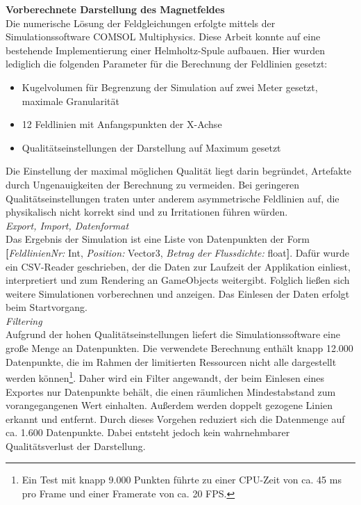 \textbf{Vorberechnete Darstellung des Magnetfeldes}\\
Die numerische Lösung der Feldgleichungen erfolgte mittels der Simulationssoftware COMSOL Multiphysics. Diese Arbeit konnte auf eine bestehende Implementierung einer Helmholtz-Spule aufbauen. Hier wurden lediglich die folgenden Parameter für die Berechnung der Feldlinien gesetzt:
\begin{itemize}
	\setlength{\itemsep}{-1pt}
	\singlespacing
	\item Kugelvolumen für Begrenzung der Simulation auf zwei Meter gesetzt, maximale Granularität
	\item 12 Feldlinien mit Anfangspunkten der X-Achse
	\item Qualitätseinstellungen der Darstellung auf Maximum gesetzt
\end{itemize}

Die Einstellung der maximal möglichen Qualität liegt darin begründet, Artefakte durch Ungenauigkeiten der Berechnung zu vermeiden. Bei geringeren Qualitätseinstellungen traten unter anderem asymmetrische Feldlinien auf, die physikalisch nicht korrekt sind und zu Irritationen führen würden.\\

\textit{Export, Import, Datenformat}\\
Das Ergebnis der Simulation ist eine Liste von Datenpunkten der Form \textbf{[}\textit{FeldlinienNr:} Int, \textit{Position:} Vector3, \textit{Betrag der Flussdichte:} float\textbf{]}. Dafür wurde ein CSV-Reader geschrieben, der die Daten zur Laufzeit der Applikation einliest, interpretiert und zum Rendering an GameObjects weitergibt. Folglich ließen sich weitere Simulationen vorberechnen und anzeigen. Das Einlesen der Daten erfolgt beim Startvorgang.\\

\textit{Filtering}\\
Aufgrund der hohen Qualitätseinstellungen liefert die Simulationssoftware eine große Menge an Datenpunkten. Die verwendete Berechnung enthält knapp 12.000 Datenpunkte, die im Rahmen der limitierten Ressourcen nicht alle dargestellt werden können\footnote{Ein Test mit knapp 9.000 Punkten führte zu einer CPU-Zeit von ca. 45 ms pro Frame und einer Framerate von ca. 20 FPS.}. Daher wird ein Filter angewandt, der beim Einlesen eines Exportes nur Datenpunkte behält, die einen räumlichen Mindestabstand zum vorangegangenen Wert einhalten. Außerdem werden doppelt gezogene Linien erkannt und entfernt. Durch dieses Vorgehen reduziert sich die Datenmenge auf ca. 1.600 Datenpunkte. Dabei entsteht jedoch kein wahrnehmbarer Qualitätsverlust der Darstellung.\\

